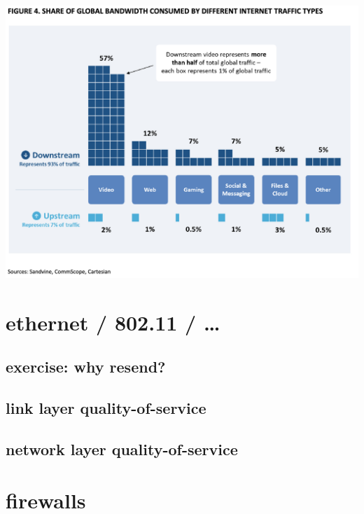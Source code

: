 \begin{frame}{}
\begin{center}
\includegraphics[width=0.8\pagewidth]{../network/internet_data.png}
\end{center}
\end{frame}

\section{ethernet / 802.11 / \ldots}


\subsection{exercise: why resend?}



\subsection{link layer quality-of-service}


\subsection{network layer quality-of-service}


\section{firewalls} %


